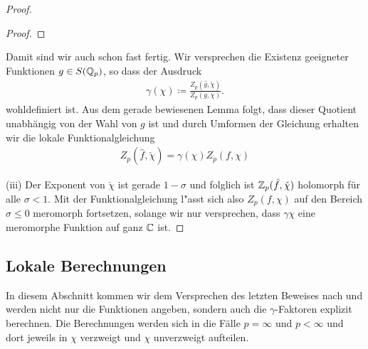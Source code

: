 \begin{proof}
\begin{proof}
		\end{proof}
		Damit sind wir auch schon fast fertig. 
		Wir versprechen die Existenz geeigneter Funktionen $g\in S({\mathbb{Q}_p})$, so dass der Ausdruck
		\begin{align*}
			\gamma(\chi) \coloneqq \frac{Z_p(\hat g, \check{\chi})}{Z_p(g, \chi)}.
		\end{align*}
		wohldefiniert ist. 
		Aus dem gerade bewiesenen Lemma folgt, dass dieser Quotient unabhängig von der Wahl von $g$ ist und durch Umformen der Gleichung erhalten wir die lokale Funktionalgleichung
		\begin{align*}
			Z_p(\hat f, \check{\chi}) = \gamma(\chi) Z_p(f, \chi)
		\end{align*}
		
		(iii) Der Exponent von $\check{\chi}$ ist gerade $1-\sigma$ und folglich ist $\mathbb{Z}_p(\hat f, \check{\chi})$ holomorph für alle $\sigma<1$.
		Mit der Funktionalgleichung l"asst sich also $Z_p(f, \chi)$ auf den Bereich $\sigma\leq0$ meromorph fortsetzen, solange wir nur versprechen, dass $\gamma{\chi}$ eine meromorphe Funktion auf ganz $\mathbb{C}$ ist.
	\end{proof}
\subsection{Lokale Berechnungen}\label{sec:lokal:calc}
	In diesem Abschnitt kommen wir dem Versprechen des letzten Beweises nach und werden nicht nur die Funktionen angeben, sondern auch die $\gamma$-Faktoren explizit berechnen.
	Die Berechnungen werden sich in die Fälle $p=\infty$ und $p<\infty$ und dort jeweils in $\chi$ verzweigt und $\chi$ unverzweigt aufteilen.
